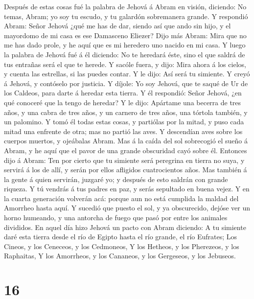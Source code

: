  Después de estas cosas fué la palabra de Jehová á Abram en
visión, diciendo: No temas, Abram; yo soy tu escudo, y tu galardón
sobremanera grande.  Y respondió Abram: Señor Jehová ¿qué me
has de dar, siendo así que ando sin hijo, y el mayordomo de mi casa es
ese Damasceno Eliezer?  Dijo más Abram: Mira que no me has
dado prole, y he aquí que es mi heredero uno nacido en mi casa.
 Y luego la palabra de Jehová fué á él diciendo: No te
heredará éste, sino el que saldrá de tus entrañas será el que te herede.
 Y sacóle fuera, y dijo: Mira ahora á los cielos, y cuenta
las estrellas, si las puedes contar. Y le dijo: Así será tu simiente.
 Y creyó á Jehová, y contóselo por justicia.  Y
díjole: Yo soy Jehová, que te saqué de Ur de los Caldeos, para darte á
heredar esta tierra.  Y él respondió: Señor Jehová, ¿en qué
conoceré que la tengo de heredar?  Y le dijo: Apártame una
becerra de tres años, y una cabra de tres años, y un carnero de tres
años, una tórtola también, y un palomino.  Y tomó él todas
estas cosas, y partiólas por la mitad, y puso cada mitad una enfrente de
otra; mas no partió las aves.  Y descendían aves sobre los
cuerpos muertos, y ojeábalas Abram.  Mas á la caída del sol
sobrecogió el sueño á Abram, y he aquí que el pavor de una grande
obscuridad cayó sobre él.  Entonces dijo á Abram: Ten por
cierto que tu simiente será peregrina en tierra no suya, y servirá á los
de allí, y serán por ellos afligidos cuatrocientos años. 
Mas también á la gente á quien servirán, juzgaré yo; y después de esto
saldrán con grande riqueza.  Y tú vendrás á tus padres en
paz, y serás sepultado en buena vejez.  Y en la cuarta
generación volverán acá: porque aun no está cumplida la maldad del
Amorrheo hasta aquí.  Y sucedió que puesto el sol, y ya
obscurecido, dejóse ver un horno humeando, y una antorcha de fuego que
pasó por entre los animales divididos.  En aquel día hizo
Jehová un pacto con Abram diciendo: A tu simiente daré esta tierra desde
el río de Egipto hasta el río grande, el río Eufrates;  Los
Cineos, y los Ceneceos, y los Cedmoneos,  Y los Hetheos, y
los Pherezeos, y los Raphaitas,  Y los Amorrheos, y los
Cananeos, y los Gergeseos, y los Jebuseos.

\hypertarget{section-15}{%
\section{16}\label{section-15}}

